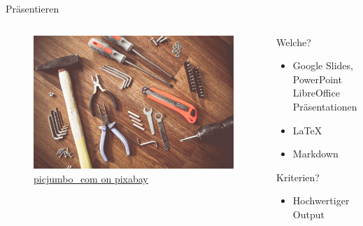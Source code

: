 \begin{frame}[t]{Präsentieren}
    \begin{columns}[t]
        \begin{column}{0.29\textwidth}      
            \vspace{-3em} 
            \begin{figure}[t]
                \begin{flushleft}
                    \includegraphics[height=0.8\textheight,trim={0 0 25cm 0},clip]{graphics/tools-864983_1280.jpg}         
                    \caption*{\href{https://pixabay.com/de/photos/werkzeuge-konstruieren-boot-864983/}{picjumbo\_com on pixabay}}    
                \end{flushleft}                
                      
            \end{figure}
        \end{column}        
        \begin{column}{0.7\textwidth}
            Welche?
            \begin{itemize}[]
                \item Google Slides, PowerPoint LibreOffice Präsentationen
                \item \LaTeX
                \item Markdown
            \end{itemize}
            Kriterien?
            \begin{itemize}[]
                \item Hochwertiger Output
            \end{itemize}
        \end{column}
    \end{columns}
\end{frame}

